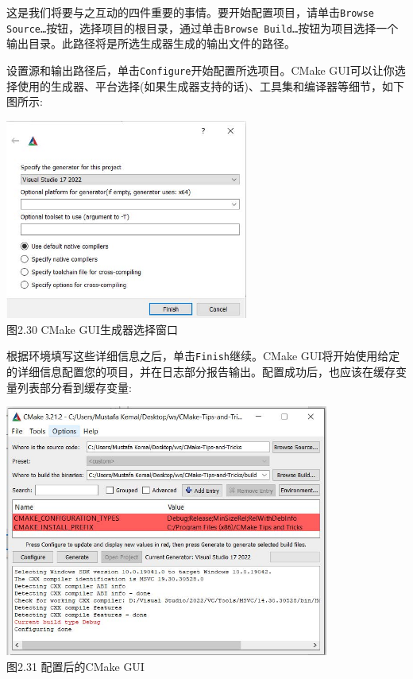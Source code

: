 这是我们将要与之互动的四件重要的事情。要开始配置项目，请单击\texttt{Browse Source…}按钮，选择项目的根目录，通过单击\texttt{Browse Build…}按钮为项目选择一个输出目录。此路径将是所选生成器生成的输出文件的路径。

设置源和输出路径后，单击\texttt{Configure}开始配置所选项目。CMake GUI可以让你选择使用的生成器、平台选择(如果生成器支持的话)、工具集和编译器等细节，如下图所示:

\begin{center}
\includegraphics[width=0.6\textwidth]{content/1/chapter2/images/30.jpg}\\
图2.30 CMake GUI生成器选择窗口
\end{center}

根据环境填写这些详细信息之后，单击\texttt{Finish}继续。CMake GUI将开始使用给定的详细信息配置您的项目，并在日志部分报告输出。配置成功后，也应该在缓存变量列表部分看到缓存变量:

\begin{center}
\includegraphics[width=0.8\textwidth]{content/1/chapter2/images/31.jpg}\\
图2.31 配置后的CMake GUI
\end{center}

